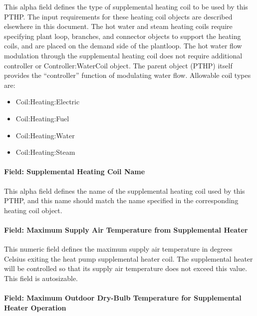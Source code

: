 This alpha field defines the type of supplemental heating coil to be used by this PTHP. The input requirements for these heating coil objects are described elsewhere in this document. The hot water and steam heating coils require specifying plant loop, branches, and connector objects to support the heating coils, and are placed on the demand side of the plantloop. The hot water flow modulation through the supplemental heating coil does not require additional controller or Controller:WaterCoil object. The parent object (PTHP) itself provides the ``controller'' function of modulating water flow. Allowable coil types are:

\begin{itemize}
\item
  Coil:Heating:Electric
\item
  Coil:Heating:Fuel
\item
  Coil:Heating:Water
\item
  Coil:Heating:Steam
\end{itemize}

\paragraph{Field: Supplemental Heating Coil Name}\label{field-supplemental-heating-coil-name-000}

This alpha field defines the name of the supplemental heating coil used by this PTHP, and this name should match the name specified in the corresponding heating coil object.

\paragraph{Field: Maximum Supply Air Temperature from Supplemental Heater}\label{field-maximum-supply-air-temperature-from-supplemental-heater-000}

This numeric field defines the maximum supply air temperature in degrees Celsius exiting the heat pump supplemental heater coil. The supplemental heater will be controlled so that its supply air temperature does not exceed this value. This field is autosizable.

\paragraph{Field: Maximum Outdoor Dry-Bulb Temperature for Supplemental Heater Operation}\label{field-maximum-outdoor-dry-bulb-temperature-for-supplemental-heater-operation-000}

